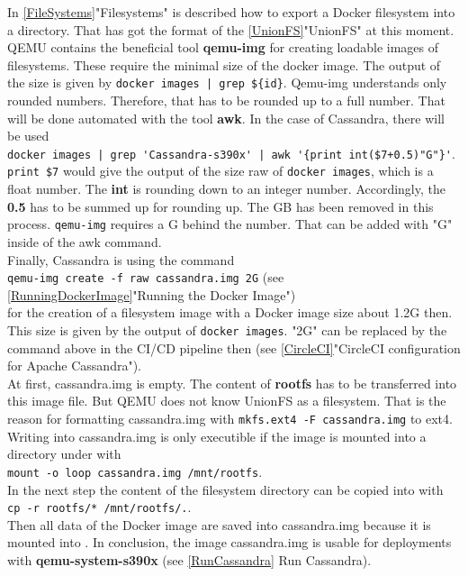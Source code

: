 In \ref{FileSystems}"Filesystems" is described how to export a Docker filesystem into a directory. That has got the format of the \ref{UnionFS}"UnionFS" at this moment. QEMU contains the beneficial tool \textbf{qemu-img} for creating loadable images of filesystems. These require the minimal size of the docker image. The output of the size is given by \lstinline!docker images | grep ${id}!. Qemu-img understands only rounded numbers. Therefore, that has to be rounded up to a full number. That will be done automated with the tool \textbf{awk}. 
In the case of Cassandra, there will be used \\
\lstinline!docker images | grep 'Cassandra-s390x' | awk '{print int($7+0.5)"G"}'!. \\
\lstinline!print $7! would give the output of the size raw of \lstinline!docker images!, which is a float number. The \textbf{int} is rounding down to an integer number. Accordingly, the \textbf{0.5} has to be summed up for rounding up. The GB has been removed in this process. \lstinline!qemu-img! requires a G behind the number. That can be added with "G" inside of the awk command. \\

Finally, Cassandra is using the command \\
\lstinline!qemu-img create -f raw cassandra.img 2G! (see \ref{RunningDockerImage}"Running the Docker Image") \\
for the creation of a filesystem image with a Docker image size about 1.2G then. This size is given by the output of \lstinline!docker images!.  "2G" can be replaced by the command above in the CI/CD pipeline then (see \ref{CircleCI}"CircleCI configuration for Apache Cassandra"). \\
At first, cassandra.img is empty. The content of \textbf{rootfs} has to be transferred into this image file. But QEMU does not know UnionFS as a filesystem. That is the reason for formatting cassandra.img with \lstinline!mkfs.ext4 -F cassandra.img! to ext4. Writing into cassandra.img is only executible if the image is mounted into a directory under  with \\
\lstinline!mount -o loop cassandra.img /mnt/rootfs!. \\ 
In the next step the content of the filesystem directory can be copied into  with \\ 
\lstinline!cp -r rootfs/* /mnt/rootfs/.!. \\ 
Then all data of the Docker image are saved into cassandra.img because it is mounted into . In conclusion, the image cassandra.img is usable for deployments with \textbf{qemu-system-s390x} (see \ref{RunCassandra} Run Cassandra). 